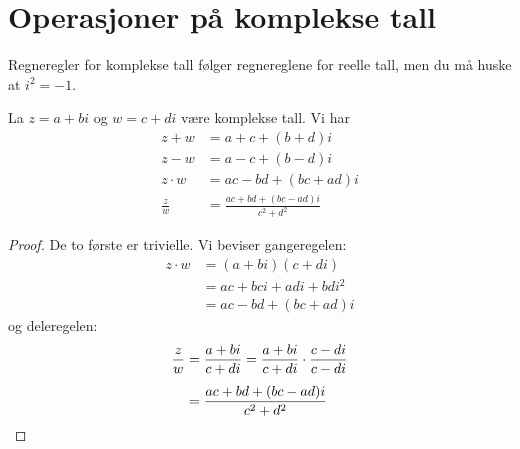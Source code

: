 \section*{Operasjoner på komplekse tall}
Regneregler for komplekse tall følger regnereglene for reelle tall, 
men du må huske at $i^2=-1$. 
\begin{thm}
La $z=a+bi$ og $w=c+di$ være komplekse tall. Vi har  
\begin{align*}
z+w&=a+c+(b+d)i \\[4pt]
z-w&=a-c+(b-d)i \\[4pt]
z\cdot w&=ac-bd+(bc+ad)i\\[4pt]
\frac{z}{w}&=\frac{ac+bd+(bc-ad)i}{c^2+d^2}
\end{align*}
\end{thm}
\begin{proof}
De to første er trivielle. Vi beviser gangeregelen:
\begin{align*}
z\cdot w&=(a+bi)(c+di)\\
&= ac+bci+adi+bdi^2\\ 
&=ac-bd+(bc+ad)i
\end{align*}
og deleregelen:
\begin{align*}
\frac{z}{w}&=\frac{a+bi}{c+di}= \frac{a+bi}{c+di}\cdot \frac{c-di}{c-di}\\[4pt]
&=\frac{ac+bd+(bc-ad)i}{c^2+d^2} \qedhere
\end{align*}
\end{proof}

